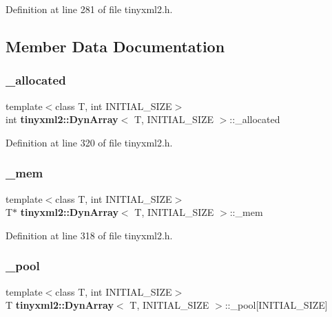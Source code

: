 Definition at line 281 of file tinyxml2.\+h.



\subsection{Member Data Documentation}
\mbox{\label{classtinyxml2_1_1_dyn_array_aee2522b771ca30bc09bff4d5b3176bfc}} 
\subsubsection{\+\_\+allocated}
{\footnotesize\ttfamily template$<$class T, int I\+N\+I\+T\+I\+A\+L\+\_\+\+S\+I\+ZE$>$ \\
int \textbf{ tinyxml2\+::\+Dyn\+Array}$<$ T, I\+N\+I\+T\+I\+A\+L\+\_\+\+S\+I\+ZE $>$\+::\+\_\+allocated\hspace{0.3cm}{\ttfamily [private]}}



Definition at line 320 of file tinyxml2.\+h.

\mbox{\label{classtinyxml2_1_1_dyn_array_ac8511e876d55f3ec64277516273434fd}} 
\subsubsection{\+\_\+mem}
{\footnotesize\ttfamily template$<$class T, int I\+N\+I\+T\+I\+A\+L\+\_\+\+S\+I\+ZE$>$ \\
T$\ast$ \textbf{ tinyxml2\+::\+Dyn\+Array}$<$ T, I\+N\+I\+T\+I\+A\+L\+\_\+\+S\+I\+ZE $>$\+::\+\_\+mem\hspace{0.3cm}{\ttfamily [private]}}



Definition at line 318 of file tinyxml2.\+h.

\mbox{\label{classtinyxml2_1_1_dyn_array_a26ed1f7dab98229d2ed867a07ee427df}} 
\subsubsection{\+\_\+pool}
{\footnotesize\ttfamily template$<$class T, int I\+N\+I\+T\+I\+A\+L\+\_\+\+S\+I\+ZE$>$ \\
T \textbf{ tinyxml2\+::\+Dyn\+Array}$<$ T, I\+N\+I\+T\+I\+A\+L\+\_\+\+S\+I\+ZE $>$\+::\+\_\+pool[I\+N\+I\+T\+I\+A\+L\+\_\+\+S\+I\+ZE]\hspace{0.3cm}{\ttfamily [private]}}



